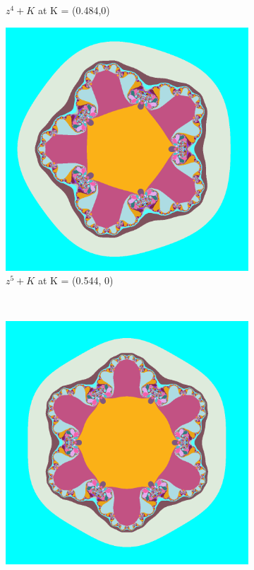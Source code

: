 \documentclass[a4paper]{article}
\begin{document}
\begin{figure}[!ht]
\begin{subfigure}[h]{0.28\textwidth}
        \caption{$z^4 + K$ at K = (0.484,0)}
        \label{fig:tiger}
    \end{subfigure}
    \begin{subfigure}[h]{0.28\textwidth}
        \includegraphics[width=\textwidth]{juliaZFive}
        \caption{$z^5 + K$ at K = (0.544, 0)}
        \label{fig:gull}
    \end{subfigure}%
    ~ %
    \begin{subfigure}[h]{0.28\textwidth}
        \includegraphics[width=\textwidth]{juliaZSix}

\end{subfigure}
\end{figure}
\end{document}
